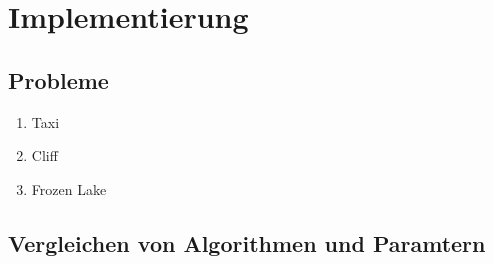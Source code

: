 \section{Implementierung}


\subsection{Probleme}

\begin{enumerate}
    \item Taxi
    \item Cliff
    \item Frozen Lake
\end{enumerate}

\subsection{Vergleichen von Algorithmen und Paramtern}

